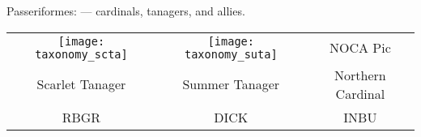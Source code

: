 \documentclass[t]{beamer}
\newcommand{\backoneline}{\vspace{-\baselineskip}}
\begin{document}
\begin{frame}{Passeriformes:  — cardinals, tanagers, and allies.}
	
	\begin{tabular}{ccc}
		\texttt{[image: taxonomy\_scta]} &
		\texttt{[image: taxonomy\_suta]} &
		NOCA Pic\tabularnewline
		Scarlet Tanager & Summer Tanager & Northern Cardinal \tabularnewline
		RBGR &
		DICK &
		INBU \tabularnewline
	\end{tabular}
	
	
\end{frame}

%
\end{document}
